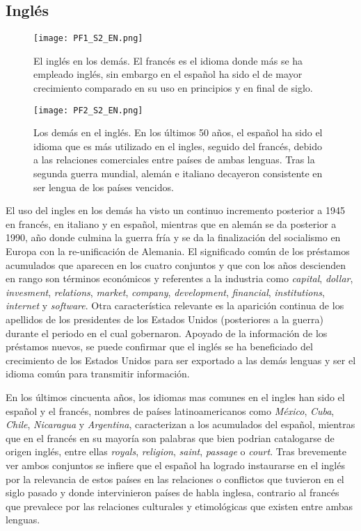 \subsection{Inglés} %


\begin{figure}[h!]
	\centering
	\texttt{[image: PF1\_S2\_EN.png]}
	\label{fig.ST_a_EN}
	\caption{El inglés en los demás. El francés es el idioma donde más se ha empleado inglés, sin embargo en el español ha sido el de mayor crecimiento comparado en su uso en principios y en final de siglo.}
\end{figure} 



\begin{figure}[h!]
	\centering
	\texttt{[image: PF2\_S2\_EN.png]}
	\label{fig.ST_b_EN}
	\caption{Los demás en el inglés. En los últimos 50 años, el español ha sido el idioma que es más utilizado en el ingles, seguido del francés, debido a las relaciones comerciales entre países de ambas lenguas.  Tras la segunda guerra mundial, alemán e italiano decayeron consistente en ser lengua de los países vencidos. }
\end{figure} 



El uso del ingles en los demás ha visto un continuo incremento posterior a 1945 en francés, en italiano y en español, mientras que en  alemán se da posterior a 1990, año donde culmina la guerra fría y se da la finalización del socialismo en Europa con la re-unificación de Alemania. El significado común de los   préstamos acumulados que aparecen en los cuatro conjuntos y que con los años descienden en rango son términos económicos y referentes a la industria como  \textit{capital}, \textit{dollar}, \textit{invesment}, \textit{relations}, \textit{market}, \textit{company}, \textit{development}, \textit{financial},  \textit{institutions}, \textit{internet} y \textit{software}. Otra característica relevante es la aparición continua de los apellidos de los presidentes de los Estados Unidos (posteriores a la guerra) durante el periodo en el cual gobernaron.  Apoyado de la información de los préstamos nuevos, se puede confirmar que el inglés se ha beneficiado del crecimiento de los Estados Unidos para ser exportado a las demás lenguas y ser el idioma común para transmitir información.   


En los últimos cincuenta años, los idiomas mas comunes en el ingles han sido el español y el francés,  nombres de países latinoamericanos como \textit{México}, \textit{Cuba}, \textit{Chile}, \textit{Nicaragua} y \textit{Argentina}, caracterizan a los acumulados del español, mientras que en el francés en su mayoría son palabras que bien podrian catalogarse de origen inglés, entre ellas \textit{royals}, \textit{religion}, \textit{saint}, \textit{passage} o \textit{court}. Tras brevemente ver ambos conjuntos se infiere que el español ha logrado instaurarse en el inglés por la relevancia de estos países en las relaciones o conflictos que tuvieron en el siglo pasado y donde intervinieron países de habla inglesa, contrario  al francés que prevalece por las relaciones culturales y etimológicas que existen entre ambas lenguas.

